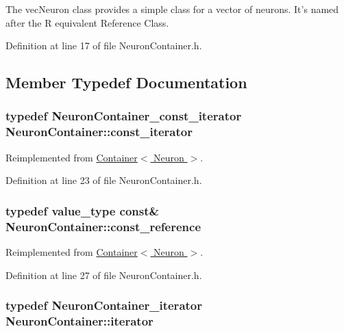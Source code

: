 The vecNeuron class provides a simple class for a vector of neurons. It's named after the R equivalent Reference Class. 

Definition at line 17 of file NeuronContainer.h.



\subsection{Member Typedef Documentation}
\hypertarget{class_neuron_container_a41749602f05e7610da7f0f1fd59f5442}{
\subsubsection[{const\_\-iterator}]{\setlength{\rightskip}{0pt plus 5cm}typedef {\bf NeuronContainer\_\-const\_\-iterator} {\bf NeuronContainer::const\_\-iterator}}}
\label{class_neuron_container_a41749602f05e7610da7f0f1fd59f5442}


Reimplemented from \hyperlink{class_container_a5eabadaffdd508cb623c955eb0af1518}{Container$<$ Neuron $>$}.



Definition at line 23 of file NeuronContainer.h.

\hypertarget{class_neuron_container_a468ffbb00b15553f73da46dd62c91c8d}{
\subsubsection[{const\_\-reference}]{\setlength{\rightskip}{0pt plus 5cm}typedef {\bf value\_\-type} const\& {\bf NeuronContainer::const\_\-reference}}}
\label{class_neuron_container_a468ffbb00b15553f73da46dd62c91c8d}


Reimplemented from \hyperlink{class_container_a9aaab0502055ee85ce5d3633fbca2675}{Container$<$ Neuron $>$}.



Definition at line 27 of file NeuronContainer.h.

\hypertarget{class_neuron_container_abf81356adaea3bfc64aa03777e9a8def}{
\subsubsection[{iterator}]{\setlength{\rightskip}{0pt plus 5cm}typedef {\bf NeuronContainer\_\-iterator} {\bf NeuronContainer::iterator}}}
\label{class_neuron_container_abf81356adaea3bfc64aa03777e9a8def}



